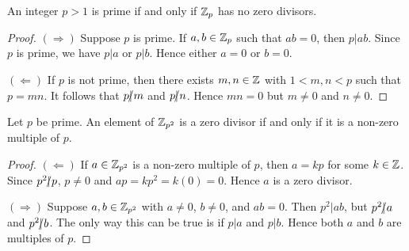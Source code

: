 \documentclass[11pt,fleqn,dvipsnames,usenames]{article}
\begin{document}
\begin{theorem}\label{primepnozerodivisors}
An integer $p > 1$ is prime if and only if $\mathbb{Z}_p$ has no zero divisors.
\end{theorem}
%
\begin{proof}\phantom{-}

$(\Rightarrow)$ Suppose $p$ is prime.  If $a,b\in\mathbb{Z}_p$ such that $ab = 0$, then $p|ab$.  Since $p$ is prime, we have $p|a$ or $p|b$.  Hence either $a=0$ or $b=0$.

$(\Leftarrow)$ If $p$ is not prime, then there exists $m,n\in\mathbb{Z}$ with $1 < m,n < p$ such that $p = mn$.  It follows that $p|\kern-0.9ex{/} m$ and $p|\kern-0.9ex{/} n$.  Hence $mn = 0$ but $m\neq 0$ and $n\neq 0$.
\end{proof}
%
\begin{theorem}
Let $p$ be prime.  An element of $\mathbb{Z}_{p^2}$ is a zero divisor if and only if it is a non-zero multiple of $p$.
\end{theorem}
%
\begin{proof}\phantom{-}

$(\Leftarrow)$ If $a\in\mathbb{Z}_{p^2}$ is a non-zero multiple of $p$, then $a = kp$ for some $k\in\mathbb{Z}$.  Since $p^2|\kern-0.9ex{/} p$, $p\neq 0$ and $ap = kp^2 = k(0) = 0$.  Hence $a$ is a zero divisor.

$(\Rightarrow)$ Suppose $a,b\in\mathbb{Z}_{p^2}$ with $a\neq0$, $b\neq0$, and $ab = 0$.  Then $p^2|ab$, but $p^2|\kern-0.9ex{/} a$ and $p^2|\kern-0.9ex{/} b$.  The only way this can be true is if $p|a$ and $p|b$.  Hence both $a$ and $b$ are multiples of $p$.
\end{proof}
\vsp
\end{document}
